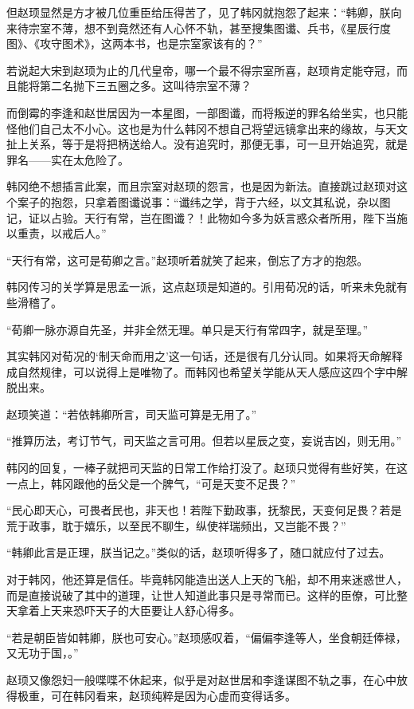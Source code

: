 但赵顼显然是方才被几位重臣给压得苦了，见了韩冈就抱怨了起来：“韩卿，朕向来待宗室不薄，想不到竟然还有人心怀不轨，甚至搜集图谶、兵书，《星辰行度图》、《攻守图术》，这两本书，也是宗室家该有的？”

若说起大宋到赵顼为止的几代皇帝，哪一个最不得宗室所喜，赵顼肯定能夺冠，而且能将第二名抛下三五圈之多。这叫待宗室不薄？

而倒霉的李逢和赵世居因为一本星图，一部图谶，而将叛逆的罪名给坐实，也只能怪他们自己太不小心。这也是为什么韩冈不想自己将望远镜拿出来的缘故，与天文扯上关系，等于是将把柄送给人。没有追究时，那便无事，可一旦开始追究，就是罪名——实在太危险了。

韩冈绝不想插言此案，而且宗室对赵顼的怨言，也是因为新法。直接跳过赵顼对这个案子的抱怨，只拿着图谶说事：“谶纬之学，背于六经，以文其私说，杂以图记，证以占验。天行有常，岂在图谶？！此物如今多为妖言惑众者所用，陛下当施以重责，以戒后人。”

“天行有常，这可是荀卿之言。”赵顼听着就笑了起来，倒忘了方才的抱怨。

韩冈传习的关学算是思孟一派，这点赵顼是知道的。引用荀况的话，听来未免就有些滑稽了。

“荀卿一脉亦源自先圣，并非全然无理。单只是天行有常四字，就是至理。”

其实韩冈对荀况的‘制天命而用之’这一句话，还是很有几分认同。如果将天命解释成自然规律，可以说得上是唯物了。而韩冈也希望关学能从天人感应这四个字中解脱出来。

赵顼笑道：“若依韩卿所言，司天监可算是无用了。”

“推算历法，考订节气，司天监之言可用。但若以星辰之变，妄说吉凶，则无用。”

韩冈的回复，一棒子就把司天监的日常工作给打没了。赵顼只觉得有些好笑，在这一点上，韩冈跟他的岳父是一个脾气，“可是天变不足畏？”

“民心即天心，可畏者民也，非天也！若陛下勤政事，抚黎民，天变何足畏？若是荒于政事，耽于嬉乐，以至民不聊生，纵使祥瑞频出，又岂能不畏？”

“韩卿此言是正理，朕当记之。”类似的话，赵顼听得多了，随口就应付了过去。

对于韩冈，他还算是信任。毕竟韩冈能造出送人上天的飞船，却不用来迷惑世人，而是直接说破了其中的道理，让世人知道此事只是寻常而已。这样的臣僚，可比整天拿着上天来恐吓天子的大臣要让人舒心得多。

“若是朝臣皆如韩卿，朕也可安心。”赵顼感叹着，“偏偏李逢等人，坐食朝廷俸禄，又无功于国，。”

赵顼又像怨妇一般喋喋不休起来，似乎是对赵世居和李逢谋图不轨之事，在心中放得极重，可在韩冈看来，赵顼纯粹是因为心虚而变得话多。

